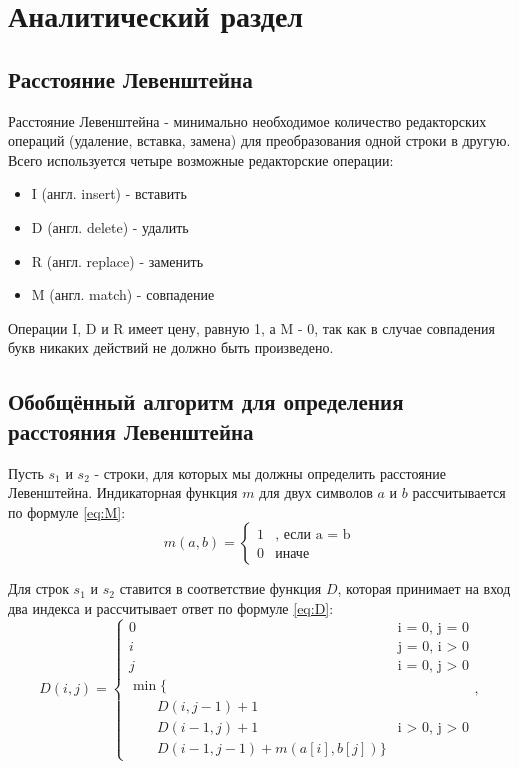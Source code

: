 \chapter{Аналитический раздел}
\section{Расстояние Левенштейна}
Расстояние Левенштейна\cite{Levenshtein} - минимально необходимое количество редакторских операций (удаление, вставка, замена) для преобразования одной строки в другую.
Всего используется четыре возможные редакторские операции:
\begin{itemize}
    \item I (англ. insert) - вставить
    \item D (англ. delete) - удалить
    \item R (англ. replace) - заменить
    \item M (англ. match) - совпадение
\end{itemize}
Операции I, D и R имеет цену, равную 1, а M - 0, так как в случае совпадения букв никаких действий не должно быть произведено.

\section{Обобщённый алгоритм для определения расстояния Левенштейна}
Пусть $s_{1}$ и $s_{2}$ - строки, для которых мы должны определить расстояние Левенштейна.
Индикаторная функция $m$ для двух символов $a$ и $b$ рассчитывается по формуле \ref{eq:M}:
\begin{equation}
	\label{eq:M}
	m(a, b) = 
 	\begin{cases}
 		1 &\text{, если a = b}\\
   		0 &\text{иначе}
 	\end{cases}
\end{equation}

Для строк $s_1$ и $s_2$ ставится в соответствие функция $D$, которая принимает на вход два индекса и рассчитывает ответ по формуле \ref{eq:D}:
\begin{equation}
	\label{eq:D}
	D(i, j) = \begin{cases}
		0 &\text{i = 0, j = 0}\\
		i &\text{j = 0, i > 0}\\
		j &\text{i = 0, j > 0}\\
		\min \lbrace \\
			\qquad D(i, j-1) + 1\\
			\qquad D(i-1, j) + 1 &\text{i > 0, j > 0}\\
			\qquad D(i-1, j-1) + m(a[i], b[j])
		\rbrace
	\end{cases},
\end{equation}

